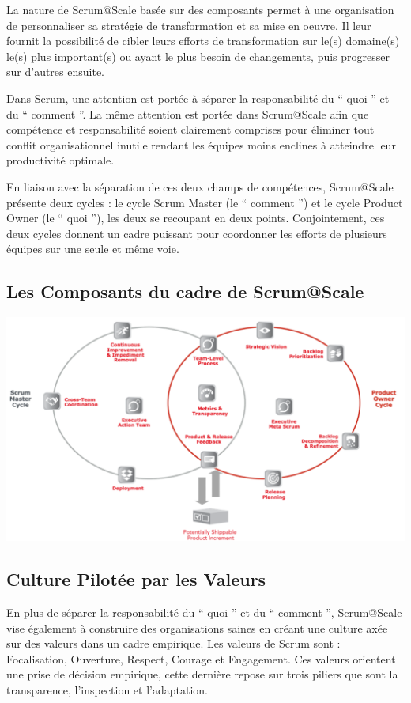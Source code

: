 \documentclass[12pt,a4paper,parskip=full]{scrartcl}
\begin{document}
La nature de Scrum@Scale basée sur des composants permet à une organisation de
personnaliser sa stratégie de transformation et sa mise en oeuvre. Il leur fournit la
possibilité de cibler leurs efforts de transformation sur le(s) domaine(s) le(s) plus
important(s) ou ayant le plus besoin de changements, puis progresser sur d’autres
ensuite.

Dans Scrum, une attention est portée à séparer la responsabilité du `` quoi '' et du
`` comment ''. La même attention est portée dans Scrum@Scale afin que compétence et
responsabilité soient clairement comprises pour éliminer tout conflit organisationnel inutile
rendant les équipes moins enclines à atteindre leur productivité optimale.

En liaison avec la séparation de ces deux champs de compétences, Scrum@Scale
présente deux cycles : le cycle Scrum Master (le `` comment '') et le cycle Product Owner
(le `` quoi ''), les deux se recoupant en deux points. Conjointement, ces deux cycles
donnent un cadre puissant pour coordonner les efforts de plusieurs équipes sur une seule
et même voie.

\subsection{Les Composants du cadre de Scrum@Scale\textregistered ~}

\includegraphics[width=1.0\linewidth]{Cycle-SMPO.png}

\subsection{Culture Pilotée par les Valeurs}
En plus de séparer la responsabilité du `` quoi '' et du `` comment '', Scrum@Scale vise
également à construire des organisations saines en créant une culture axée sur des
valeurs dans un cadre empirique. Les valeurs de Scrum sont : Focalisation, Ouverture,
Respect, Courage et Engagement. Ces valeurs orientent une prise de décision empirique,
cette dernière repose sur trois piliers que sont la transparence, l'inspection et l'adaptation.
\end{document}
